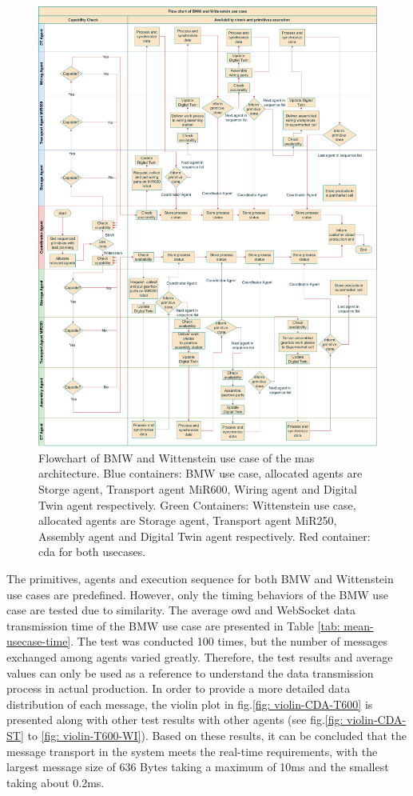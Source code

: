 \begin{figure}[htb]
    \includegraphics[width=\textwidth]{figures/tests/usecase/Usecase_flow.pdf}\hfill 
    \caption{Flowchart of BMW and Wittenstein use case of the \gls{mas} architecture. 
    Blue containers: BMW use case, allocated agents are Storge agent, 
    Transport agent MiR600, Wiring agent and Digital Twin agent respectively. 
    Green Containers: Wittenstein use case, allocated agents are Storage agent, 
    Transport agent MiR250, Assembly agent and Digital Twin agent respectively. 
    Red container: \gls{cda} for both usecases.} 
    \label{fig: Flowchart-usecase}
\end{figure}
The primitives, agents and execution sequence for both BMW and Wittenstein use cases 
are predefined. However, only the timing behaviors of the BMW use case are tested due 
to similarity. The average \gls{owd} and WebSocket data transmission time of the BMW 
use case are presented in Table \ref{tab: mean-usecase-time}. The test was conducted 
100 times, but the number of messages exchanged among agents varied greatly. Therefore, 
the test results and average values can only be used as a reference to understand the 
data transmission process in actual production. In order to provide a more detailed data 
distribution of each message, the violin plot in fig.\ref{fig: violin-CDA-T600} is 
presented along with other test results with other agents (see fig.\ref{fig: violin-CDA-ST} to \ref{fig: violin-T600-WI}). 
Based on these results, it can be concluded that the message transport in the system meets 
the real-time requirements, with the largest message size of 636 Bytes taking a maximum of 
10ms and the smallest taking about 0.2ms.


